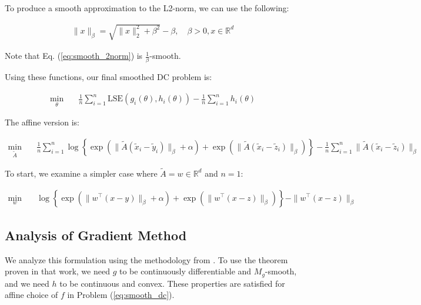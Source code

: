\documentclass[11pt]{article}
\begin{document}
To produce a smooth approximation to the L2-norm, we can use the following:

\begin{equation}
\label{eq:smooth_2norm}
\begin{aligned}
\| x \|_\beta = \sqrt{\| x \|_2^2 + \beta^2} - \beta, \quad \beta > 0, x \in \mathbb{R}^d
\end{aligned}
\end{equation}

Note that Eq. (\ref{eq:smooth_2norm}) is $\frac{1}{\beta}$-smooth.

Using these functions, our final smoothed DC problem is:

\begin{equation}
\label{eq:smooth_dc}
\begin{aligned}
    \min_{\theta} \quad & \frac{1}{n} \sum_{i=1}^{n} \textrm{LSE}(g_i(\theta), h_i(\theta)) - \frac{1}{n} \sum_{i=1}^{n} h_i(\theta)
\end{aligned}
\end{equation}

The affine version is:

\begin{equation}
\begin{aligned}
    \min_{\tilde{A}} \quad & \frac{1}{n} \sum_{i=1}^{n} \log\left\{ \exp \left(\| \tilde{A}(\tilde{x}_i - \tilde{y}_i) \|_\beta + \alpha \right) + \exp \left(\| \tilde{A}(\tilde{x}_i - \tilde{z}_i) \|_\beta \right)  \right \} - \frac{1}{n} \sum_{i=1}^{n} \| \tilde{A}(\tilde{x}_i - \tilde{z}_i) \|_\beta
\end{aligned}
\end{equation}

To start, we examine a simpler case where $\tilde{A} = w \in \mathbb{R}^d$ and $n = 1$:

\begin{equation}
\begin{aligned}
    \min_{w} \quad & \log\left\{ \exp \left(\| w^{\top}(x - y) \|_\beta + \alpha \right) + \exp \left(\| w^{\top}(x - z) \|_\beta \right)  \right \} - \| w^{\top}(x - z) \|_\beta
\end{aligned}
\end{equation}

\subsection{Analysis of Gradient Method}

We analyze this formulation using the methodology from \cite{khamaru_convergence_2018}. To use the theorem proven in that work, we need $g$ to be continuously differentiable and $M_g$-smooth, and we need $h$ to be continuous and convex. These properties are satisfied for affine choice of $f$ in Problem (\ref{eq:smooth_dc}).
\end{document}
